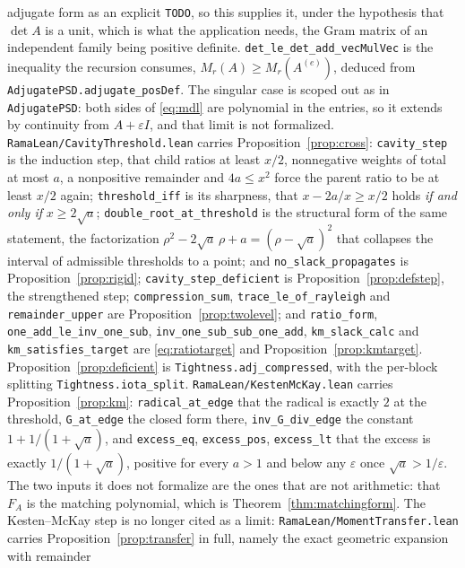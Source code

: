 \documentclass[11pt]{article}
\theoremstyle{remark}
\begin{document}
adjugate form as an explicit \texttt{TODO}, so this supplies it, under the hypothesis
that $\det A$ is a unit, which is what the application needs, the Gram matrix of an
independent family being positive definite. \texttt{det\_le\_det\_add\_vecMulVec} is
the inequality the recursion consumes, $M_r(A)\ge M_r(A^{(e)})$, deduced from
\texttt{AdjugatePSD.adjugate\_posDef}. The singular case is scoped out as in
\texttt{AdjugatePSD}: both sides of \eqref{eq:mdl} are polynomial in the entries, so it
extends by continuity from $A+\varepsilon I$, and that limit is not formalized.
\texttt{RamaLean/CavityThreshold.lean} carries
Proposition~\ref{prop:cross}: \texttt{cavity\_step} is the induction step, that
child ratios at least $x/2$, nonnegative weights of total at most $a$, a nonpositive
remainder and $4a\le x^2$ force the parent ratio to be at least $x/2$ again;
\texttt{threshold\_iff} is its sharpness, that $x-2a/x\ge x/2$ holds \emph{if and
only if} $x\ge2\sqrt a$; \texttt{double\_root\_at\_threshold} is the structural
form of the same statement, the factorization
$\rho^2-2\sqrt a\,\rho+a=(\rho-\sqrt a)^2$ that collapses the interval of admissible
thresholds to a point; and \texttt{no\_slack\_propagates} is
Proposition~\ref{prop:rigid}; \texttt{cavity\_step\_deficient} is
Proposition~\ref{prop:defstep}, the strengthened step; \texttt{compression\_sum},
\texttt{trace\_le\_of\_rayleigh} and \texttt{remainder\_upper} are
Proposition~\ref{prop:twolevel}; and \texttt{ratio\_form},
\texttt{one\_add\_le\_inv\_one\_sub}, \texttt{inv\_one\_sub\_sub\_one\_add},
\texttt{km\_slack\_calc} and \texttt{km\_satisfies\_target} are
\eqref{eq:ratiotarget} and Proposition~\ref{prop:kmtarget}. Proposition~\ref{prop:deficient} is
\texttt{Tightness.adj\_compressed}, with the per-block splitting
\texttt{Tightness.iota\_split}. \texttt{RamaLean/KestenMcKay.lean} carries
Proposition~\ref{prop:km}: \texttt{radical\_at\_edge} that the radical is exactly $2$ at
the threshold, \texttt{G\_at\_edge} the closed form there, \texttt{inv\_G\_div\_edge} the
constant $1+1/(1+\sqrt a)$, and \texttt{excess\_eq}, \texttt{excess\_pos},
\texttt{excess\_lt} that the excess is exactly $1/(1+\sqrt a)$, positive for every $a>1$
and below any $\varepsilon$ once $\sqrt a>1/\varepsilon$. The two inputs it does not
formalize are the ones that are not arithmetic: that $F_A$ is the matching polynomial,
which is Theorem~\ref{thm:matchingform}. The Kesten--McKay step is no longer cited as a
limit: \texttt{RamaLean/MomentTransfer.lean} carries Proposition~\ref{prop:transfer} in
full, namely the exact geometric expansion with remainder
\end{document}
